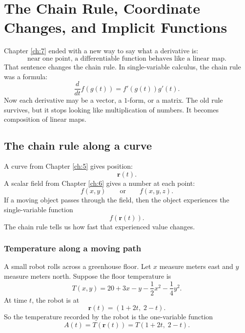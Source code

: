 

\chapter{The Chain Rule, Coordinate Changes, and Implicit Functions}
\label{ch:8}

Chapter \ref{ch:7} ended with a new way to say what a derivative is:
\[
    \text{near one point, a differentiable function behaves like a linear map.}
\]
That sentence changes the chain rule.  In single-variable calculus, the chain rule was
a formula:
\[
    \frac{d}{dt}f(g(t))=f'(g(t))g'(t).
\]
Now each derivative may be a vector, a \(1\)-form, or a matrix.  The old rule survives,
but it stops looking like multiplication of numbers.  It becomes composition of linear
maps.

\section{The chain rule along a curve}
\label{sec:8.1}

A curve from Chapter \ref{ch:5} gives position:
\[
    \mathbf r(t).
\]
A scalar field from Chapter \ref{ch:6} gives a number at each point:
\[
    f(x,y)
    \qquad\text{or}\qquad
    f(x,y,z).
\]
If a moving object passes through the field, then the object experiences the
single-variable function
\[
    f(\mathbf r(t)).
\]
The chain rule tells us how fast that experienced value changes.

\subsection{Temperature along a moving path}

A small robot rolls across a greenhouse floor.  Let \(x\) measure meters east and
\(y\) measure meters north.  Suppose the floor temperature is
\[
    T(x,y)=20+3x-y-\frac12x^2-\frac14y^2.
\]
At time \(t\), the robot is at
\[
    \mathbf r(t)=(1+2t,\;2-t).
\]
So the temperature recorded by the robot is the one-variable function
\[
    A(t)=T(\mathbf r(t))
    =
    T(1+2t,\;2-t).
\]

